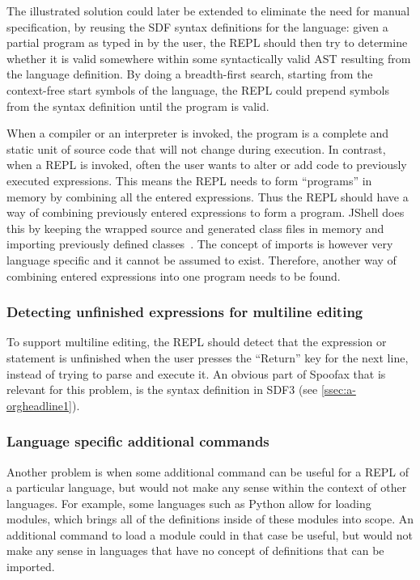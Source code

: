 The illustrated solution could later be extended to eliminate the need for
manual specification, by reusing the SDF syntax definitions for the language:
given a partial program as typed in by the user, the REPL should then try to
determine whether it is valid somewhere within some syntactically valid AST
resulting from the language definition. By doing a breadth-first search,
starting from the context-free start symbols of the language, the REPL could
prepend symbols from the syntax definition until the program is valid.

When a compiler or an interpreter is invoked, the program is a complete and
static unit of source code that will not change during execution. In contrast,
when a REPL is invoked, often the user wants to alter or add code to previously
executed expressions. This means the REPL needs to form ``programs'' in memory
by combining all the entered expressions.  Thus the REPL should have a way of
combining previously entered expressions to form a program. JShell does this by
keeping the wrapped source and generated class files in memory and importing
previously defined classes~\cite{jshell-repl}. The concept of imports is
however very language specific and it cannot be assumed to exist.  Therefore,
another way of combining entered expressions into one program needs to be
found.

\subsubsection{Detecting unfinished expressions for multiline editing}
\label{sec:a-detect-unfin-expr}
To support multiline editing, the REPL should detect that the
expression or statement is unfinished when the user presses the
``Return'' key for the next line, instead of trying to parse and
execute it. An obvious part of Spoofax that is relevant for this
problem, is the syntax definition in SDF3 (see
\cref{ssec:a-orgheadline1}).

\subsubsection{Language specific additional commands}
\label{sec:a-lang-spec-addit}
Another problem is when some additional command can be useful for a
REPL of a particular language, but would not make any sense within the
context of other languages. For example, some languages such as Python
allow for loading modules, which brings all of the definitions inside
of these modules into scope. An additional command to load a module could in that
case be useful, but would not make any sense in languages that have no
concept of definitions that can be imported.

